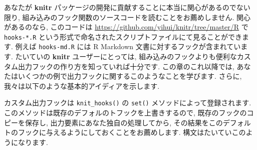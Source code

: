 \documentclass[
  11pt,
]{bxjsreport}
\newenvironment{Shaded}{\begin{snugshade}}{\end{snugshade}}
\newcommand{\AttributeTok}[1]{\textcolor[rgb]{0.77,0.63,0.00}{#1}}
\newcommand{\CommentTok}[1]{\textcolor[rgb]{0.56,0.35,0.01}{\textit{#1}}}
\newcommand{\ControlFlowTok}[1]{\textcolor[rgb]{0.13,0.29,0.53}{\textbf{#1}}}
\newcommand{\FunctionTok}[1]{\textcolor[rgb]{0.00,0.00,0.00}{#1}}
\newcommand{\NormalTok}[1]{#1}
\newcommand{\OtherTok}[1]{\textcolor[rgb]{0.56,0.35,0.01}{#1}}
\newcommand{\SpecialCharTok}[1]{\textcolor[rgb]{0.00,0.00,0.00}{#1}}
\newcommand{\StringTok}[1]{\textcolor[rgb]{0.31,0.60,0.02}{#1}}
\begin{document}
\begin{Shaded}
\end{Shaded}

あなたが \textbf{knitr} パッケージの開発に貢献することに本当に関心があるのでない限り, 組み込みのフック関数のソースコードを読むことをお薦めしません. 関心があるのなら, このコードは \url{https://github.com/yihui/knitr/tree/master/R} で \texttt{hooks-*.R} という形式で命名されたスクリプトファイルにて見ることができます. 例えば \texttt{hooks-md.R} には R Markdown 文書に対するフックが含まれています. たいていの \textbf{knitr} ユーザーにとっては, 組み込みのフックよりも便利なカスタム出力フックの作り方を知っていれば十分です. この章のこれ以降では, あなたはいくつかの例で出力フックに関するこのようなことを学びます. さらに, 我々は以下のような基本的アイディアを示します.

カスタム出力フックは \texttt{knit\_hooks()} の \texttt{set()} メソッドによって登録されます. このメソッドは既存のデフォルのトフックを上書きするので, 既存のフックのコピーを保存し, 出力要素にあなた独自の処理してから, その結果をこのデフォルトのフックに与えるようにしておくことをお薦めします. 構文はたいていこのようになります.

\begin{Shaded}
\end{Shaded}
\end{document}

